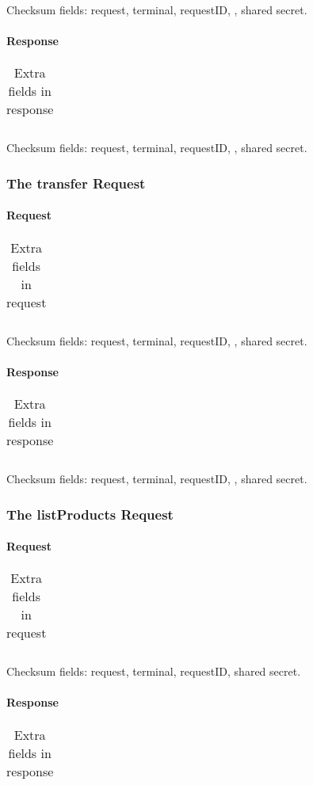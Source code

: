 \documentclass[a4paper,11pt]{article}
\newcommand{\code}[1]
   {\textsf{\mbox{#1}}}
\newcommand{\rightcellwidth}{25em}
\newcommand{\reqsection}[1]
    {\subsubsection{The \code{#1} Request}}
\newcommand{\partsection}[1]
           {\paragraph{#1}}
\begin{document}
Checksum fields: request, terminal, requestID, , shared secret.

\partsection{Response}
\begin{table}[!ht]
  \begin{tabular}{|l|p{\rightcellwidth}|}
    \hline
       \\\hline
  \end{tabular} 
  \caption{Extra fields in \code{} response}
\end{table}

Checksum fields: request, terminal, requestID, , shared secret.


\reqsection{transfer}

\partsection{Request}
\begin{table}[!ht]
  \begin{tabular}{|l|p{\rightcellwidth}|}
    \hline
       \\\hline
  \end{tabular} 
  \caption{Extra fields in \code{} request}
\end{table}

Checksum fields: request, terminal, requestID, , shared secret.

\partsection{Response}
\begin{table}[!ht]
  \begin{tabular}{|l|p{\rightcellwidth}|}
    \hline
       \\\hline
  \end{tabular} 
  \caption{Extra fields in \code{} response}
\end{table}

Checksum fields: request, terminal, requestID, , shared secret.


\reqsection{listProducts}

\partsection{Request}
\begin{table}[!ht]
  \begin{tabular}{|l|p{\rightcellwidth}|}
    \hline
       \\\hline
  \end{tabular} 
  \caption{Extra fields in \code{} request}
\end{table}

Checksum fields: request, terminal, requestID, shared secret.

\partsection{Response}
\begin{table}[!ht]
  \begin{tabular}{|l|p{\rightcellwidth}|}
    \hline
       \\\hline
  \end{tabular} 
  \caption{Extra fields in \code{} response}
\end{table}
\end{document}
